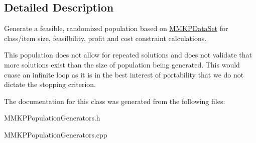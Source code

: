 \subsection{Detailed Description}
Generate a feasible, randomized population based on \hyperlink{class_m_m_k_p_data_set}{M\+M\+K\+P\+Data\+Set} for class/item size, feasilbility, profit and cost constraint calculations. 

This population does not allow for repeated solutions and does not validate that more solutions exist than the size of population being generated. This would cuase an infinite loop as it is in the best interest of portability that we do not dictate the stopping criterion. 

The documentation for this class was generated from the following files\+:\begin{DoxyCompactItemize}
\item 
M\+M\+K\+P\+Population\+Generators.\+h\item 
M\+M\+K\+P\+Population\+Generators.\+cpp\end{DoxyCompactItemize}
